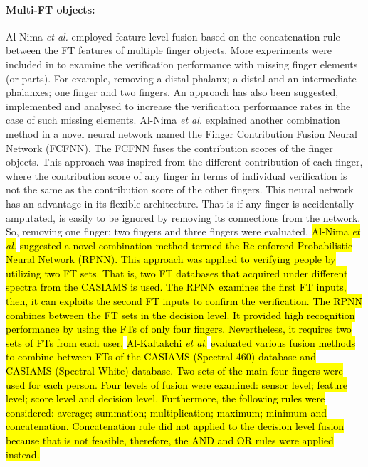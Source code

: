 \documentclass[review]{elsarticle}
\begin{document}
	\paragraph{\textbf{Multi-FT objects:}} Al-Nima \textit{et al.} \cite{Al-Nima2015Human,Al-Nima2016ANovel,Al-Nima2017Robust,Al-Nima2017efficient} employed feature level fusion based on the concatenation rule between the FT features of multiple finger objects. More experiments were included in \cite{Al-Nima2017Robust} to examine the verification performance with missing finger elements (or parts). For example, removing a distal phalanx; a distal and an intermediate phalanxes; one finger and two fingers. An approach has also been suggested, implemented and analysed to increase the verification performance rates in the case of such missing elements. Al-Nima \textit{et al.} \cite{Al-Nima2017finger} explained another combination method in a novel neural network named the Finger Contribution Fusion Neural Network (FCFNN). The FCFNN fuses the contribution scores of the finger objects. This approach was inspired from the different contribution of each finger, where the contribution score of any finger in terms of individual verification is not the same as the contribution score of the other fingers. This neural network has an advantage in its flexible architecture. That is if any finger is accidentally amputated, is easily to be ignored by removing its connections from the network. So, removing one finger; two fingers and three fingers were evaluated. \hl{Al-Nima \textit{et al.}} \cite{al2018personal} \hl{suggested a novel combination method termed the Re-enforced Probabilistic Neural Network (RPNN). This approach was applied to verifying people by utilizing two FT sets. That is, two FT databases that acquired under different spectra from the CASIAMS is used. The RPNN examines the first FT inputs, then, it can exploits the second FT inputs to confirm the verification. The RPNN combines between the FT sets in the decision level. It provided high recognition performance by using the FTs of only four fingers. Nevertheless, it requires two sets of FTs from each user.} \hl{Al-Kaltakchi \textit{et al.}} \cite{al2018finger} \hl{evaluated various fusion methods to combine between FTs of the CASIAMS (Spectral 460) database and CASIAMS (Spectral White) database. Two sets of the main four fingers were used for each person. Four	levels of fusion were examined: sensor level; feature level; score level and decision level. Furthermore, the following rules were considered: average; summation; multiplication;	maximum; minimum and concatenation. Concatenation rule did not applied to the decision level fusion because that is not feasible, therefore, the AND and OR rules were applied instead.} 
\end{document}
